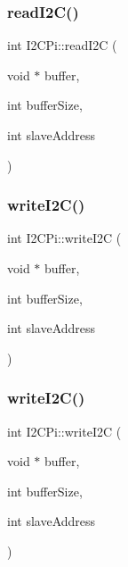 \mbox{\label{class_i2_c_pi_ae48a8e4619925b48657c92f2ee2449d3}} 
\subsubsection{\texorpdfstring{read\+I2\+C()}{readI2C()}\hspace{0.1cm}{\footnotesize\ttfamily [2/2]}}
{\footnotesize\ttfamily int I2\+C\+Pi\+::read\+I2C (\begin{DoxyParamCaption}\item[{void $\ast$}]{buffer,  }\item[{int}]{buffer\+Size,  }\item[{int}]{slave\+Address }\end{DoxyParamCaption})}

\mbox{\label{class_i2_c_pi_a4a7ad57107c689b1bb8ebaccd11856d5}} 
\subsubsection{\texorpdfstring{write\+I2\+C()}{writeI2C()}\hspace{0.1cm}{\footnotesize\ttfamily [1/2]}}
{\footnotesize\ttfamily int I2\+C\+Pi\+::write\+I2C (\begin{DoxyParamCaption}\item[{void $\ast$}]{buffer,  }\item[{int}]{buffer\+Size,  }\item[{int}]{slave\+Address }\end{DoxyParamCaption})}

\mbox{\label{class_i2_c_pi_a4a7ad57107c689b1bb8ebaccd11856d5}} 
\subsubsection{\texorpdfstring{write\+I2\+C()}{writeI2C()}\hspace{0.1cm}{\footnotesize\ttfamily [2/2]}}
{\footnotesize\ttfamily int I2\+C\+Pi\+::write\+I2C (\begin{DoxyParamCaption}\item[{void $\ast$}]{buffer,  }\item[{int}]{buffer\+Size,  }\item[{int}]{slave\+Address }\end{DoxyParamCaption})}



